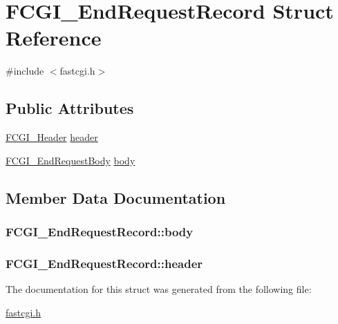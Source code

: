 \hypertarget{structFCGI__EndRequestRecord}{\section{F\-C\-G\-I\-\_\-\-End\-Request\-Record Struct Reference}
\label{structFCGI__EndRequestRecord}
}


{\ttfamily \#include $<$fastcgi.\-h$>$}

\subsection*{Public Attributes}
\begin{DoxyCompactItemize}
\item 
\hyperlink{structFCGI__Header}{F\-C\-G\-I\-\_\-\-Header} \hyperlink{structFCGI__EndRequestRecord_ac6c2e12ec6cda0e757f1d1a1efcdb1cb}{header}
\item 
\hyperlink{structFCGI__EndRequestBody}{F\-C\-G\-I\-\_\-\-End\-Request\-Body} \hyperlink{structFCGI__EndRequestRecord_ae69eaa8a7a915a9316cbda216038b1be}{body}
\end{DoxyCompactItemize}


\subsection{Member Data Documentation}
\hypertarget{structFCGI__EndRequestRecord_ae69eaa8a7a915a9316cbda216038b1be}{
\subsubsection[{body}]{ F\-C\-G\-I\-\_\-\-End\-Request\-Record\-::body}}\label{structFCGI__EndRequestRecord_ae69eaa8a7a915a9316cbda216038b1be}
\hypertarget{structFCGI__EndRequestRecord_ac6c2e12ec6cda0e757f1d1a1efcdb1cb}{
\subsubsection[{header}]{ F\-C\-G\-I\-\_\-\-End\-Request\-Record\-::header}}\label{structFCGI__EndRequestRecord_ac6c2e12ec6cda0e757f1d1a1efcdb1cb}


The documentation for this struct was generated from the following file\-:\begin{DoxyCompactItemize}
\item 
\hyperlink{fastcgi_8h}{fastcgi.\-h}\end{DoxyCompactItemize}
